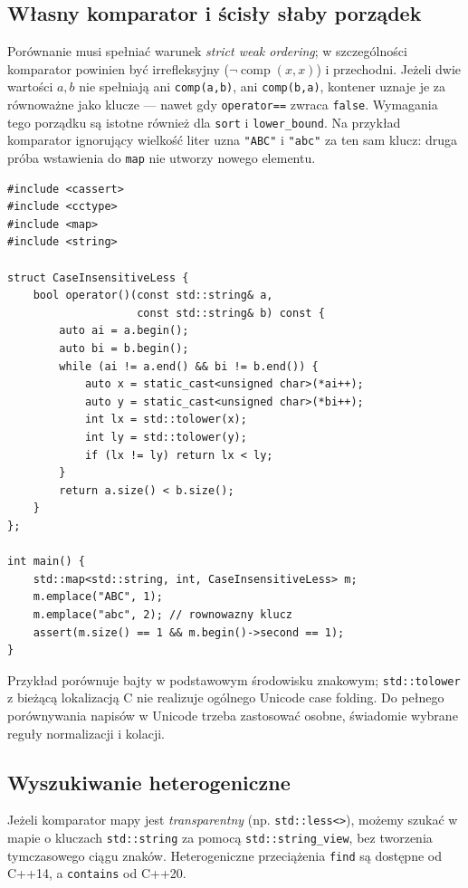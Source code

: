 \subsection{Własny komparator i ścisły słaby porządek}

Porównanie musi spełniać warunek \emph{strict weak ordering}; w
szczególności komparator powinien być irrefleksyjny
($\neg\operatorname{comp}(x,x)$) i przechodni. Jeżeli dwie wartości
$ a,b $ nie spełniają ani \texttt{comp(a,b)}, ani \texttt{comp(b,a)},
kontener uznaje je za równoważne jako klucze --- nawet gdy
\texttt{operator==} zwraca \texttt{false}. Wymagania tego porządku
są istotne również dla \texttt{sort} i \texttt{lower\_bound}.
Na przykład komparator ignorujący wielkość liter uzna \texttt{"ABC"}
i \texttt{"abc"} za ten sam klucz: druga próba wstawienia do
\texttt{map} nie utworzy nowego elementu.

\begin{lstlisting}[caption={Mapowanie bez rozrozniania wielkosci liter: prosty komparator; kompletny program.}]
#include <cassert>
#include <cctype>
#include <map>
#include <string>

struct CaseInsensitiveLess {
    bool operator()(const std::string& a,
                    const std::string& b) const {
        auto ai = a.begin();
        auto bi = b.begin();
        while (ai != a.end() && bi != b.end()) {
            auto x = static_cast<unsigned char>(*ai++);
            auto y = static_cast<unsigned char>(*bi++);
            int lx = std::tolower(x);
            int ly = std::tolower(y);
            if (lx != ly) return lx < ly;
        }
        return a.size() < b.size();
    }
};

int main() {
    std::map<std::string, int, CaseInsensitiveLess> m;
    m.emplace("ABC", 1);
    m.emplace("abc", 2); // rownowazny klucz
    assert(m.size() == 1 && m.begin()->second == 1);
}
\end{lstlisting}

Przykład porównuje bajty w podstawowym środowisku znakowym;
\texttt{std::tolower} z bieżącą lokalizacją C nie realizuje ogólnego
Unicode case folding. Do pełnego porównywania napisów w Unicode trzeba
zastosować osobne, świadomie wybrane reguły normalizacji i kolacji.

\subsection{Wyszukiwanie heterogeniczne}

Jeżeli komparator mapy jest \emph{transparentny} (np. \texttt{std::less<>}),
możemy szukać w mapie o kluczach \texttt{std::string} za pomocą
\texttt{std::string\_view}, bez tworzenia tymczasowego ciągu znaków.
Heterogeniczne przeciążenia \texttt{find} są dostępne
od C++14, a \texttt{contains} od C++20.

